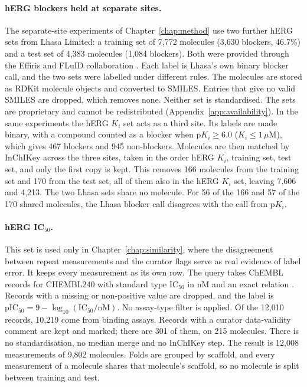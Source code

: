 \paragraph{hERG blockers held at separate sites.} The separate-site experiments of Chapter~\ref{chap:method} use two further hERG sets from Lhasa Limited: a training set of 7,772 molecules (3,630 blockers, 46.7\%) and a test set of 4,383 molecules (1,084 blockers). Both were provided through the Effiris and FLuID collaboration \citep{Bassani2023, Hanser2023}. Each label is Lhasa's own binary blocker call, and the two sets were labelled under different rules. The molecules are stored as RDKit molecule objects and converted to SMILES. Entries that give no valid SMILES are dropped, which removes none. Neither set is standardised. The sets are proprietary and cannot be redistributed (Appendix~\ref{app:availability}). In the same experiments the hERG $K_i$ set acts as a third site. Its labels are made binary, with a compound counted as a blocker when $\mathrm{p}K_i \ge 6.0$ ($K_i \le 1\,\mu$M), which gives 467 blockers and 945 non-blockers. Molecules are then matched by InChIKey across the three sites, taken in the order hERG $K_i$, training set, test set, and only the first copy is kept. This removes 166 molecules from the training set and 170 from the test set, all of them also in the hERG $K_i$ set, leaving 7,606 and 4,213. The two Lhasa sets share no molecule. For 56 of the 166 and 57 of the 170 shared molecules, the Lhasa blocker call disagrees with the call from p$K_i$.

\paragraph{\texorpdfstring{hERG IC$_{50}$.}{hERG IC50.}} This set is used only in Chapter~\ref{chap:similarity}, where the disagreement between repeat measurements and the curator flags serve as real evidence of label error. It keeps every measurement as its own row. The query takes ChEMBL records for CHEMBL240 with standard type IC$_{50}$ in nM and an exact relation \citep{Zdrazil2023}. Records with a missing or non-positive value are dropped, and the label is $\mathrm{pIC_{50}} = 9 - \log_{10}(\mathrm{IC_{50}}/\mathrm{nM})$. No assay-type filter is applied. Of the 12,010 records, 10,219 come from binding assays. Records with a curator data-validity comment are kept and marked; there are 301 of them, on 215 molecules. There is no standardisation, no median merge and no InChIKey step. The result is 12,008 measurements of 9,802 molecules. Folds are grouped by scaffold, and every measurement of a molecule shares that molecule's scaffold, so no molecule is split between training and test.

